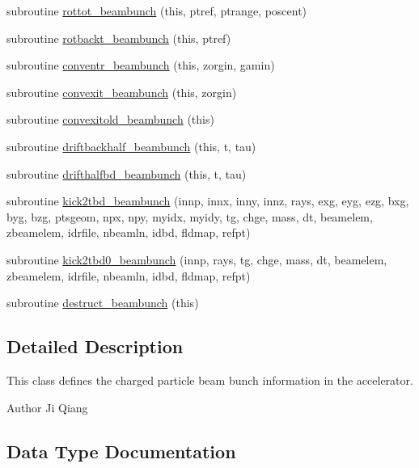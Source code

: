 \begin{DoxyCompactItemize}
subroutine \mbox{\hyperlink{namespacebeambunchclass_a6708b67cc6ed6cbdbba8340d6512ab4f}{rottot\+\_\+beambunch}} (this, ptref, ptrange, poscent)
\item 
subroutine \mbox{\hyperlink{namespacebeambunchclass_a26facece08e7014e20db987d5df33c42}{rotbackt\+\_\+beambunch}} (this, ptref)
\item 
subroutine \mbox{\hyperlink{namespacebeambunchclass_a875b1de387c0e2e667bfa7a33bb70311}{conventr\+\_\+beambunch}} (this, zorgin, gamin)
\item 
subroutine \mbox{\hyperlink{namespacebeambunchclass_a4126361c8be17915e9c6c24697801f47}{convexit\+\_\+beambunch}} (this, zorgin)
\item 
subroutine \mbox{\hyperlink{namespacebeambunchclass_a53657fc9705a5a612bc5775c121c314e}{convexitold\+\_\+beambunch}} (this)
\item 
subroutine \mbox{\hyperlink{namespacebeambunchclass_ae62dcc6dbc6d31b22daefa701822d49d}{driftbackhalf\+\_\+beambunch}} (this, t, tau)
\item 
subroutine \mbox{\hyperlink{namespacebeambunchclass_a45079536068a233e490ed282b4225c93}{drifthalfbd\+\_\+beambunch}} (this, t, tau)
\item 
subroutine \mbox{\hyperlink{namespacebeambunchclass_a513182caa95677071325abf64bba8279}{kick2tbd\+\_\+beambunch}} (innp, innx, inny, innz, rays, exg, eyg, ezg, bxg, byg, bzg, ptsgeom, npx, npy, myidx, myidy, tg, chge, mass, dt, beamelem, zbeamelem, idrfile, nbeamln, idbd, fldmap, refpt)
\item 
subroutine \mbox{\hyperlink{namespacebeambunchclass_a38583f97e581a51940801aeb0f8398a0}{kick2tbd0\+\_\+beambunch}} (innp, rays, tg, chge, mass, dt, beamelem, zbeamelem, idrfile, nbeamln, idbd, fldmap, refpt)
\item 
subroutine \mbox{\hyperlink{namespacebeambunchclass_a0fe1e4d236f209b18f75b272bf07782d}{destruct\+\_\+beambunch}} (this)
\end{DoxyCompactItemize}


\subsection{Detailed Description}
This class defines the charged particle beam bunch information in the accelerator. 

\begin{DoxyAuthor}{Author}
Ji Qiang 
\end{DoxyAuthor}


\subsection{Data Type Documentation}
\label{structbeambunchclass_1_1beambunch}
